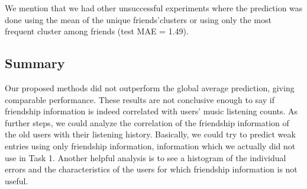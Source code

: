 We mention that we had other unsuccessful experiments where the prediction was done using the mean of the unique friends'clusters or using only the most frequent cluster among friends (test MAE = 1.49).

\subsection{Summary}
Our proposed methods did not outperform the global average prediction, giving comparable performance. These results are not conclusive enough to say if friendship information is indeed correlated with users' music listening counts. As further steps, we could analyze the correlation of the friendship information of the old users with their listening history. Basically, we could try to predict weak entries using only friendship information, information which we actually did not use in Task 1. Another helpful analysis is to see a histogram of the individual errors and the characteristics of the users for which friendship information is not useful.


